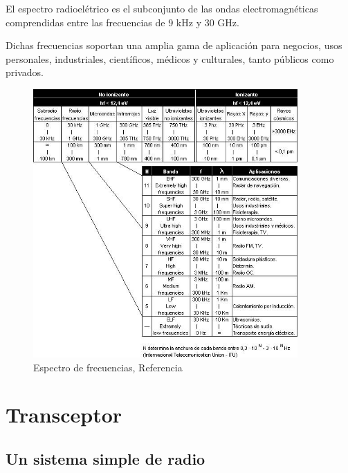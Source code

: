 El espectro radioel\'etrico es el subconjunto de las ondas electromagn\'eticas comprendidas entre las frecuencias de 
9 kHz y 30 GHz.

Dichas frecuencias soportan una amplia gama de aplicaci\'on para negocios, usos personales, industriales, cient\'ificos,
m\'edicos y culturales, tanto p\'ublicos como privados.



\begin{figure}[!htb]
  \centering
 \includegraphics[width=0.9\textwidth]{09.sintesis.comunicaciones.a.bordo/Imagenes.U09/espectro-frecuencias.jpg} 
  \caption{Espectro de frecuencias, Referencia \protect\cite{Espectro_comunicaciones}}
  \label{fig:espectro.frecuencias}
\end{figure}



\section{Transceptor}
\label{sec:09.01.transceptor}

\subsection{Un sistema simple de radio}
\label{sec:09.01.01.sistema.simple.radio}


